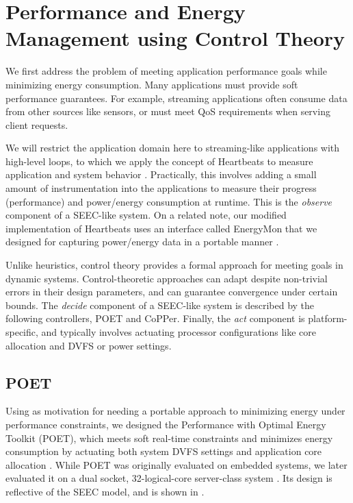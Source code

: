 \section{Performance and Energy Management using Control Theory}

We first address the problem of meeting application performance goals while minimizing energy consumption.
Many applications must provide soft performance guarantees.
For example, streaming applications often consume data from other sources like sensors, or must meet QoS requirements when serving client requests.

We will restrict the application domain here to streaming-like applications with high-level loops, to which we apply the concept of Heartbeats to measure application and system behavior \cite{icac2010heartbeats}.
Practically, this involves adding a small amount of instrumentation into the applications to measure their progress (performance) and power/energy consumption at runtime.
This is the \emph{observe} component of a SEEC-like system.
On a related note, our modified implementation of Heartbeats uses an interface called EnergyMon that we designed for capturing power/energy data in a portable manner \cite{energymon}.

Unlike heuristics, control theory provides a formal approach for meeting goals in dynamic systems.
Control-theoretic approaches can adapt despite non-trivial errors in their design parameters, and can guarantee convergence under certain bounds.
The \emph{decide} component of a SEEC-like system is described by the following controllers, POET and CoPPer.
Finally, the \emph{act} component is platform-specific, and typically involves actuating processor configurations like core allocation and DVFS or power settings.


\subsection{POET}

Using \cite{Imes2014} as motivation for needing a portable approach to minimizing energy under performance constraints, we designed the Performance with Optimal Energy Toolkit (POET), which meets soft real-time constraints and minimizes energy consumption by actuating both system DVFS settings and application core allocation \cite{POET}.
While POET was originally evaluated on embedded systems, we later evaluated it on a dual socket, 32-logical-core server-class system \cite{POETMCSoC}.
Its design is reflective of the SEEC model, and is shown in .

